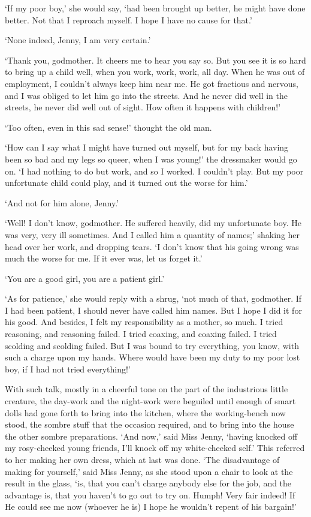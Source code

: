 ‘If my poor boy,’ she would say, ‘had been brought up better, he might
have done better. Not that I reproach myself. I hope I have no cause for
that.’

‘None indeed, Jenny, I am very certain.’

‘Thank you, godmother. It cheers me to hear you say so. But you see it
is so hard to bring up a child well, when you work, work, work, all day.
When he was out of employment, I couldn’t always keep him near me. He
got fractious and nervous, and I was obliged to let him go into the
streets. And he never did well in the streets, he never did well out of
sight. How often it happens with children!’

‘Too often, even in this sad sense!’ thought the old man.

‘How can I say what I might have turned out myself, but for my back
having been so bad and my legs so queer, when I was young!’ the
dressmaker would go on. ‘I had nothing to do but work, and so I worked.
I couldn’t play. But my poor unfortunate child could play, and it turned
out the worse for him.’

‘And not for him alone, Jenny.’

‘Well! I don’t know, godmother. He suffered heavily, did my unfortunate
boy. He was very, very ill sometimes. And I called him a quantity of
names;’ shaking her head over her work, and dropping tears. ‘I don’t
know that his going wrong was much the worse for me. If it ever was, let
us forget it.’

‘You are a good girl, you are a patient girl.’

‘As for patience,’ she would reply with a shrug, ‘not much of that,
godmother. If I had been patient, I should never have called him names.
But I hope I did it for his good. And besides, I felt my responsibility
as a mother, so much. I tried reasoning, and reasoning failed. I tried
coaxing, and coaxing failed. I tried scolding and scolding failed. But I
was bound to try everything, you know, with such a charge upon my hands.
Where would have been my duty to my poor lost boy, if I had not tried
everything!’

With such talk, mostly in a cheerful tone on the part of the industrious
little creature, the day-work and the night-work were beguiled until
enough of smart dolls had gone forth to bring into the kitchen,
where the working-bench now stood, the sombre stuff that the occasion
required, and to bring into the house the other sombre preparations.
‘And now,’ said Miss Jenny, ‘having knocked off my rosy-cheeked young
friends, I’ll knock off my white-cheeked self.’ This referred to her
making her own dress, which at last was done. ‘The disadvantage of
making for yourself,’ said Miss Jenny, as she stood upon a chair to look
at the result in the glass, ‘is, that you can’t charge anybody else for
the job, and the advantage is, that you haven’t to go out to try on.
Humph! Very fair indeed! If He could see me now (whoever he is) I hope
he wouldn’t repent of his bargain!’

